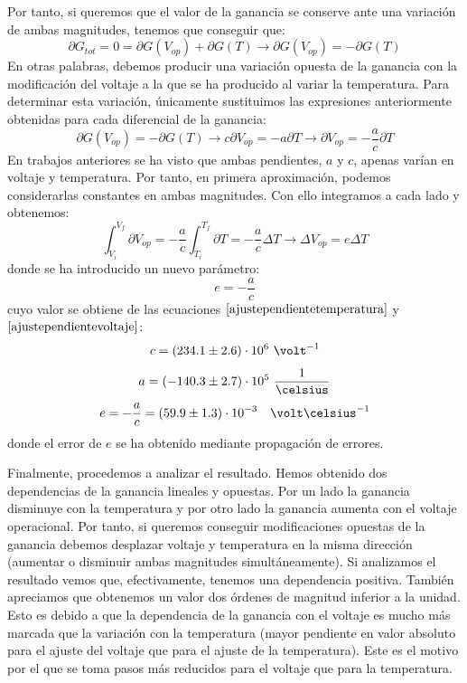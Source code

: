 Por tanto, si queremos que el valor de la ganancia se conserve ante una variación de ambas magnitudes, tenemos que conseguir que: 
\begin{equation}
\partial G_{tot} = 0 =  \partial G(V_{op}) + \partial G(T) \longrightarrow \partial G(V_{op}) = -\partial G(T)  
\label{basecompensacion}
\end{equation}
En otras palabras, debemos producir una  variación opuesta  de la ganancia con la modificación del voltaje a la que se ha producido al variar la temperatura. Para determinar esta variación, únicamente sustituimos las expresiones anteriormente obtenidas para cada diferencial de la ganancia:
\begin{equation}
\partial G(V_{op}) = - \partial G(T)  \longrightarrow c \partial V_{op}= - a \partial T \longrightarrow  \partial V_{op}= - \frac{a}{c} \partial T
\label{compensacionparciales}
\end{equation}
En trabajos anteriores\cite{TFMSiPM2, tesisSiPM, cladtesis} se ha visto que ambas pendientes, $a$ y $c$, apenas varían en voltaje y temperatura. Por tanto, en primera aproximación, podemos considerarlas constantes en ambas magnitudes. Con ello integramos a cada lado y obtenemos:
\begin{equation}
\int_{V_i}^{V_f} \partial V_{op}= - \frac{a}{c} \int_{T_i}^{T_f}\partial T = - \frac{a}{c} \Delta T \longrightarrow \Delta V_{op}= e \Delta T
\label{integral}
\end{equation}
donde se ha introducido un nuevo parámetro: $$e=-\frac{a}{c}$$ cuyo valor se obtiene de las ecuaciones $\eqref{ajustependientetemperatura}$  y $\eqref{ajustependientevoltaje}$:
\begin{equation}
c=(234.1 \pm 2.6) \cdot 10^6~\volt^{-1}
\label{pendientevoltaje}
\end{equation}
\begin{equation}
a=(-140.3 \pm 2.7) \cdot 10^5~\frac{1}{\celsius}
\label{pendientetemperatura}
\end{equation}
\begin{equation}
e=-\frac{a}{c} = (59.9 \pm 1.3) \cdot 10^{-3} \quad \volt  \celsius^{-1}
\label{pendientecompensacion}
\end{equation}
donde el error de $e$ se ha obtenido mediante propagación de errores. 

Finalmente, procedemos a analizar el resultado. Hemos obtenido dos dependencias de la ganancia lineales y opuestas. Por un lado la ganancia disminuye con la temperatura y por otro lado la ganancia aumenta con el voltaje operacional. Por tanto, si queremos conseguir modificaciones opuestas de la ganancia debemos desplazar voltaje y temperatura en la misma dirección (aumentar o disminuir ambas magnitudes simultáneamente). Si analizamos el resultado vemos que, efectivamente, tenemos una dependencia positiva.
También apreciamos que obtenemos un valor dos órdenes de magnitud inferior a la unidad. Esto es debido a que la dependencia de la ganancia con el voltaje es mucho más marcada que la variación con la temperatura (mayor pendiente en valor absoluto para el ajuste del voltaje que para el ajuste de la temperatura). Este es el motivo por el que se toma pasos más reducidos para el voltaje que para la temperatura. 

